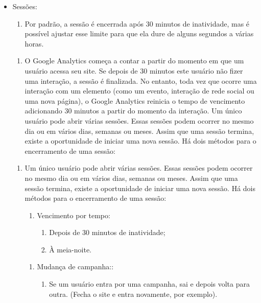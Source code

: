 \documentclass{article}%
\begin{document}
\begin{itemize}%
\item%
Sessões:%
\begin{enumerate}[label=-]%
\item%
Por padrão, a sessão é encerrada após 30 minutos de inatividade, mas é possível ajustar esse limite para que ela dure de alguns segundos a várias horas.%
\end{enumerate}%
\begin{enumerate}[label=]%
\item%
O Google Analytics começa a contar a partir do momento em que um usuário acessa seu site. Se depois de 30 minutos este usuário não fizer uma interação, a sessão é finalizada. No entanto, toda vez que ocorre uma interação com um elemento (como um evento, interação de rede social ou uma nova página), o Google Analytics reinicia o tempo de vencimento adicionando 30 minutos a partir do momento da interação.
 Um único usuário pode abrir várias sessões. Essas sessões podem ocorrer no mesmo dia ou em vários dias, semanas ou meses. Assim que uma sessão termina, existe a oportunidade de iniciar uma nova sessão. Há dois métodos para o encerramento de uma sessão:%
\end{enumerate}%
\begin{enumerate}[label=]%
\item%
Um único usuário pode abrir várias sessões. Essas sessões podem ocorrer no mesmo dia ou em vários dias, semanas ou meses. Assim que uma sessão termina, existe a oportunidade de iniciar uma nova sessão. Há dois métodos para o encerramento de uma sessão:%
\begin{enumerate}[label=•]%
\item%
Vencimento por tempo:%
\begin{enumerate}[label=•]%
\item%
Depois de 30 minutos de inatividade;%
\item%
À meia-noite.%
\end{enumerate}%
\end{enumerate}%
\begin{enumerate}[label=•]%
\item%
Mudança de campanha::%
\begin{enumerate}[label=•]%
\item%
Se um usuário entra por uma campanha, sai e depois volta para outra. (Fecha o site e entra novamente, por exemplo).%
\end{enumerate}%
\end{enumerate}%
\end{enumerate}%
\end{itemize}%
\end{document}
